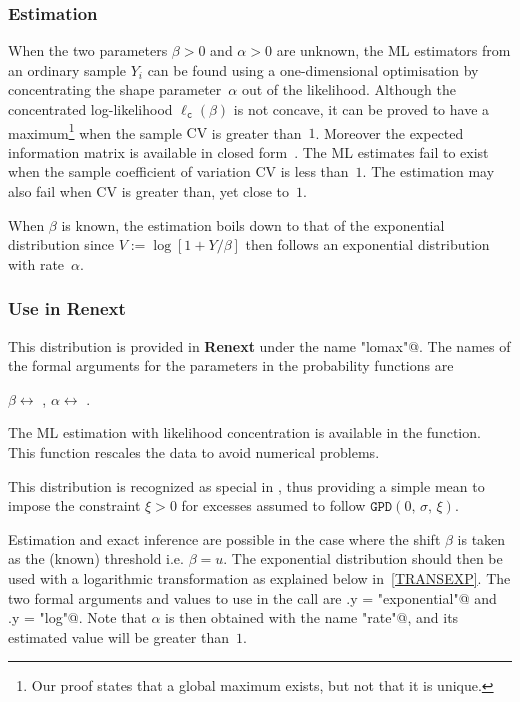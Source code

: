 \documentclass[a4paper]{report}
\newcommand{\pkg}[1]{\textbf{#1}}
\begin{document}
\subsubsection*{Estimation}
When the two parameters $\beta>0$ and $\alpha>0$ are unknown, the ML
estimators from an ordinary sample $Y_i$ can be found using a
one-dimensional optimisation by concentrating the shape parameter~$\alpha$ out
of the likelihood. Although the concentrated log-likelihood
$\ell_{\texttt{c}}(\beta)$ is not concave, it can be proved to have a
maximum\footnote{Our proof states that a global maximum exists, but
  not that it is unique.} when 
the sample $\textrm{CV}$ is
greater than~$1$.  Moreover the expected information matrix is
available in closed form~\citep{LomaxBias}.  The ML estimates fail to exist when the
sample coefficient of variation $\textrm{CV}$ is less than~$1$. The
estimation may also fail when $\textrm{CV}$ is greater than, yet close
to~$1$.
%

When $\beta$ is known, the estimation boils down to that of the 
exponential distribution since $V:= \log[1 + Y/\beta]$ then follows
an exponential distribution with rate~$\alpha$.


\subsubsection*{Use in Renext}
This distribution is provided in \pkg{Renext} under the name \verb@"lomax"@. The
names of the formal arguments for the parameters in the probability functions are
\begin{center}
  $\beta \leftrightarrow$ \verb@scale@, \qquad
  $\alpha \leftrightarrow$ \verb@shape@. 
\end{center}
The ML estimation with likelihood concentration 
is available in the \verb@flomax@ function. This function rescales the 
data to avoid numerical problems.

This distribution is recognized as special in \verb@Renouv@, thus providing a simple
mean to impose the constraint $\xi>0$ for excesses assumed to
follow $\texttt{GPD}(0,\,\sigma,\,\xi)$. 

Estimation and exact inference are possible in the case where the
shift $\beta$ is taken as the (known) threshold i.e. $\beta =
u$. The exponential distribution should then be used with a
logarithmic transformation as explained below in~\ref{TRANSEXP}. The
two formal arguments and values to use in the \verb@Renouv@ call
are \verb@distname.y = "exponential"@ and \verb@trans.y = "log"@. Note that
$\alpha$ is then obtained with the name \verb@"rate"@, and its estimated value
will be greater than~$1$.
\end{document}
